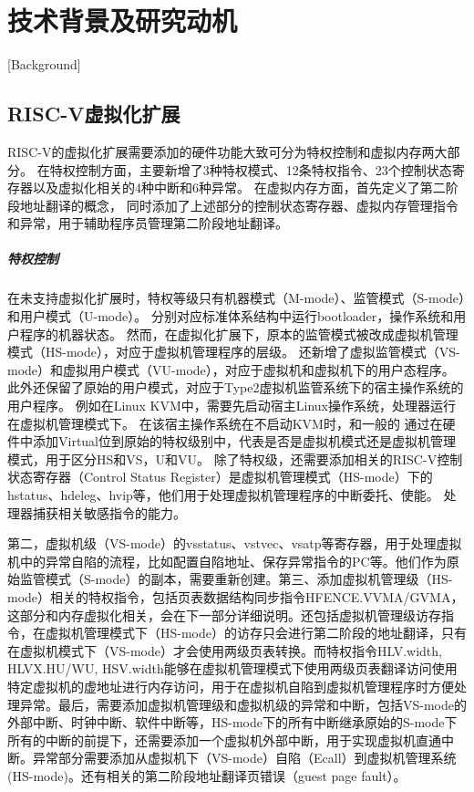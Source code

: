 \chapter{技术背景及研究动机}[Background]

\section{RISC-V虚拟化扩展}
RISC-V的虚拟化扩展需要添加的硬件功能大致可分为特权控制和虚拟内存两大部分。
在特权控制方面，主要新增了3种特权模式、12条特权指令、23个控制状态寄存器以及虚拟化相关的4种中断和6种异常。
在虚拟内存方面，首先定义了第二阶段地址翻译的概念，
同时添加了上述部分的控制状态寄存器、虚拟内存管理指令和异常，用于辅助程序员管理第二阶段地址翻译。

\paragraph{特权控制}
在未支持虚拟化扩展时，特权等级只有机器模式（M-mode）、监管模式（S-mode）和用户模式（U-mode）。
分别对应标准体系结构中运行bootloader，操作系统和用户程序的机器状态。
然而，在虚拟化扩展下，原本的监管模式被改成虚拟机管理模式（HS-mode），对应于虚拟机管理程序的层级。
还新增了虚拟监管模式（VS-mode）和虚拟用户模式（VU-mode），对应于虚拟机和虚拟机下的用户态程序。
此外还保留了原始的用户模式，对应于Type2虚拟机监管系统下的宿主操作系统的用户程序。
例如在Linux KVM中，需要先启动宿主Linux操作系统，处理器运行在虚拟机管理模式下。
在该宿主操作系统在不启动KVM时，和一般的
通过在硬件中添加Virtual位到原始的特权级别中，代表是否是虚拟机模式还是虚拟机管理模式，用于区分HS和VS，U和VU。
除了特权级，还需要添加相关的RISC-V控制状态寄存器（Control Status Register）是虚拟机管理模式（HS-mode）下的hstatus、hdeleg、hvip等，他们用于处理虚拟机管理程序的中断委托、使能。
处理器捕获相关敏感指令的能力。

第二，虚拟机级（VS-mode）的vsstatus、vstvec、vsatp等寄存器，用于处理虚拟机中的异常自陷的流程，比如配置自陷地址、保存异常指令的PC等。他们作为原始监管模式（S-mode）的副本，需要重新创建。第三、添加虚拟机管理级（HS-mode）相关的特权指令，包括页表数据结构同步指令HFENCE.VVMA/GVMA，这部分和内存虚拟化相关，会在下一部分详细说明。还包括虚拟机管理级访存指令，在虚拟机管理模式下（HS-mode）的访存只会进行第二阶段的地址翻译，只有在虚拟机模式下（VS-mode）才会使用两级页表转换。而特权指令HLV.width, HLVX.HU/WU, HSV.width能够在虚拟机管理模式下使用两级页表翻译访问使用特定虚拟机的虚地址进行内存访问，用于在虚拟机自陷到虚拟机管理程序时方便处理异常。最后，需要添加虚拟机管理级和虚拟机级的异常和中断，包括VS-mode的外部中断、时钟中断、软件中断等，HS-mode下的所有中断继承原始的S-mode下所有的中断的前提下，还需要添加一个虚拟机外部中断，用于实现虚拟机直通中断。异常部分需要添加从虚拟机下（VS-mode）自陷（Ecall）到虚拟机管理系统(HS-mode)。还有相关的第二阶段地址翻译页错误（guest page fault）。

